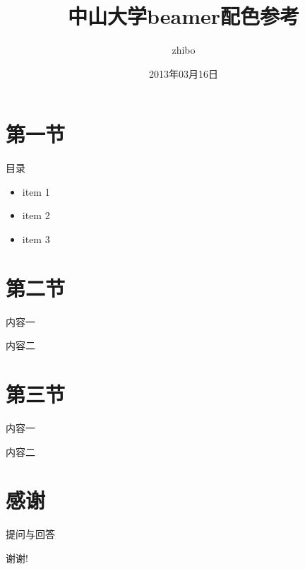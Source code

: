 \documentclass[UTF8]{beamer}
\title{中山大学beamer配色参考}
\author{zhibo}
\institute{中山大学\\信息科学与技术学院}
\date{2013年03月16日}
\begin{document}
    \maketitle
    \section*{第一节}
        \begin{frame}{目录}
            \begin{itemize}
              \item item 1
              \item item 2
              \item item 3
            \end{itemize}
        \end{frame}
    \section{第二节}
        \begin{frame}{内容一}
        \end{frame}
        \begin{frame}{内容二}
        \end{frame}
    \section{第三节}
        \begin{frame}{内容一}
        \end{frame}
        \begin{frame}{内容二}
        \end{frame}
    \section{感谢}
        \begin{frame}{提问与回答}
            \begin{center}
                \Huge 谢谢!
            \end{center}
        \end{frame}
\end{document}
